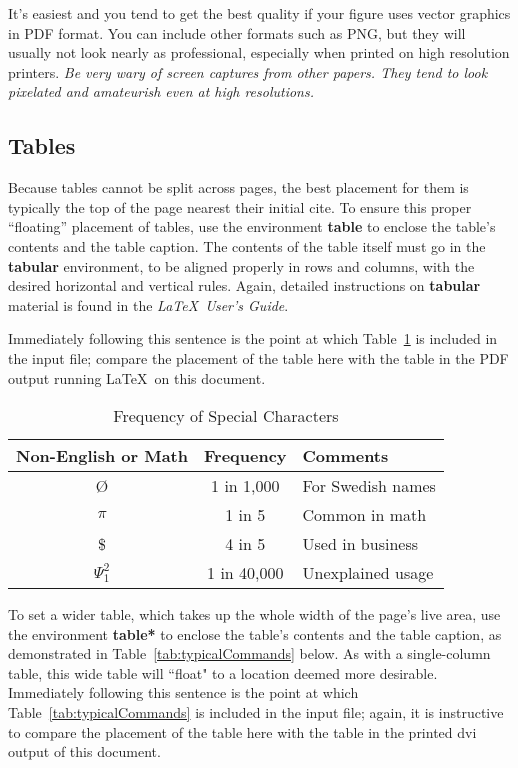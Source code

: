 \documentclass{sig-alternate}
\begin{document}
It's easiest and you tend to get the best quality if your figure uses vector graphics
in PDF format. You can include other formats such as PNG, but they will usually
not look nearly as professional, especially when printed on high resolution printers.
\emph{Be very wary of screen captures from other papers. They tend to look pixelated
and amateurish even at high resolutions.}

\subsection{Tables}
\label{sec:tables}

Because tables cannot be split across pages, the best
placement for them is typically the top of the page
nearest their initial cite.  To
ensure this proper ``floating'' placement of tables, use the
environment \textbf{table} to enclose the table's contents and
the table caption.  The contents of the table itself must go
in the \textbf{tabular} environment, to
be aligned properly in rows and columns, with the desired
horizontal and vertical rules.  Again, detailed instructions
on \textbf{tabular} material
is found in the \textit{\LaTeX\ User's Guide}.

Immediately following this sentence is the point at which
Table~\ref{tab:frequencyOfSpecialChars} is included in the input file; 
compare the placement of the table here with the table in the
PDF output running \LaTeX\ on this document.

\begin{table}[t]
\centering
\caption{Frequency of Special Characters}
\label{tab:frequencyOfSpecialChars}
\begin{tabular}{c|c|l}
Non-English or Math & Frequency & Comments\\ \hline
\O & 1 in 1,000 & For Swedish names\\
$\pi$ & 1 in 5 & Common in math\\
\$ & 4 in 5 & Used in business\\
$\Psi^2_1$ & 1 in 40,000 & Unexplained usage\\
\end{tabular}
\end{table}

To set a wider table, which takes up the whole width of
the page's live area, use the environment
\textbf{table*} to enclose the table's contents and
the table caption, as demonstrated in Table~\ref{tab:typicalCommands} below.  
As with a single-column table, this wide
table will ``float" to a location deemed more desirable.
Immediately following this sentence is the point at which
Table~\ref{tab:typicalCommands} is included in the input file; again, it is
instructive to compare the placement of the
table here with the table in the printed dvi
output of this document.
\end{document}
